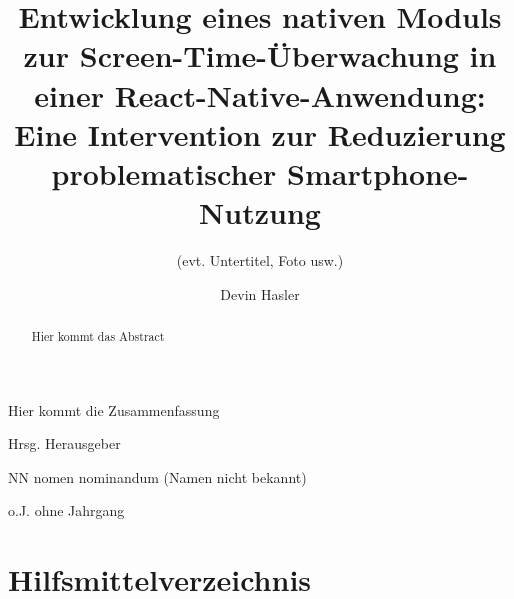 \documentclass{ffhsthesis}
\begin{document}
    \title{Entwicklung eines nativen Moduls zur Screen-Time-Überwachung in einer React-Native-Anwendung: Eine Intervention zur Reduzierung problematischer Smartphone-Nutzung}
    \subtitle{(evt. Untertitel, Foto usw.)} %
    \author{Devin Hasler}

    \maketitle


    \begin{zusammenfassung}
        Hier kommt die Zusammenfassung
    \end{zusammenfassung}
    \begin{abstract}
        Hier kommt das Abstract
    \end{abstract}
    \tableofcontents

    \begin{abkuerzungen}[MUSTER] %
        \item[Hrsg.] Herausgeber
        \item[NN] nomen nominandum (Namen nicht bekannt)
        \item [o.J.] ohne Jahrgang
    \end{abkuerzungen}


    \startThesis %




    
    
    
    
    
    
    
    

    \clearpage\appendix
    \renewcommand{\thesection}{A}
    
    \listoffigures
    \listoftables
    \lstlistoflistings
    \chapter*{Hilfsmittelverzeichnis}
\end{document}
